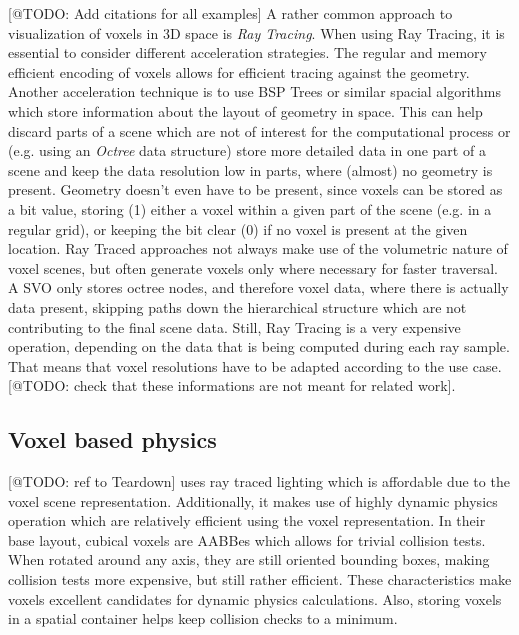 [@TODO: Add citations for all examples]
A rather common approach to visualization of voxels in 3D space is \emph{Ray Tracing}. When using 
Ray Tracing, it is essential to consider different acceleration strategies. The regular 
and memory efficient encoding of voxels allows for efficient tracing against the geometry. 
Another acceleration technique is to use \ac{BSP} Trees or similar spacial algorithms which store 
information about the layout of geometry in space. This can help discard parts of a scene which are 
not of interest for the computational process or (e.g. using an \emph{Octree} data structure) store 
more detailed data in one part of a scene and keep the data resolution low in parts, where (almost) 
no geometry is present. Geometry doesn't even have to be present, since voxels can be stored 
as a bit value, storing (1) either a voxel within a given part of the scene (e.g. in a regular grid),
or keeping the bit clear (0) if no voxel is present at the given location. 
Ray Traced approaches not always make use of the volumetric nature of voxel scenes, but often generate 
voxels only where necessary for faster traversal. A \ac{SVO} only stores octree nodes, and therefore voxel 
data, where there is actually data present, skipping paths down the hierarchical structure which are not 
contributing to the final scene data. Still, Ray Tracing is a very expensive operation, depending on the 
data that is being computed during each ray sample. That means that voxel resolutions have to be adapted 
according to the use case. [@TODO: check that these informations are not meant for related work].

\subsection{Voxel based physics}

[@TODO: ref to Teardown] uses ray traced lighting which is affordable due to the voxel scene representation.
Additionally, it makes use of highly dynamic physics operation which are relatively efficient using the voxel 
representation. In their base layout, cubical voxels are \ac{AABB}es which allows for trivial collision tests.
When rotated around any axis, they are still oriented bounding boxes, making collision tests more expensive,
but still rather efficient. These characteristics make voxels excellent candidates for dynamic physics 
calculations. Also, storing voxels in a spatial container helps keep collision checks to a minimum. \\


